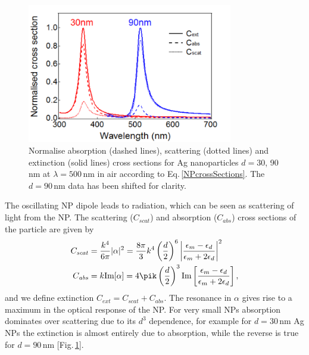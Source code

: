 \begin{figure}[h!] 
\centering    
\includegraphics[width=0.8\textwidth]{Fig8}
\caption{Normalise absorption (dashed lines), scattering (dotted lines) and extinction (solid lines) cross sections for Ag nanoparticles $d=30$, 90\,nm at $\lambda=500$\,nm in air according to Eq.\,\ref{NPcrossSections}. The $d=90$\,nm data has been shifted for clarity.}
\label{3Fig8}
\end{figure}

The oscillating NP dipole leads to radiation, which can be seen as scattering of light from the NP. The scattering ($C_{\mathit{scat}}$) and absorption ($C_{\mathit{abs}}$) cross sections of the particle are given by
\begin{subequations}
\label{NPcrossSections}
\begin{align}
C_{\mathit{scat}} &= \frac{k^4}{6\pi}|\alpha|^2 = \frac{8\pi}{3}k^4\left(\frac{d}{2}\right)^6 \left|\frac{\epsilon_m-\epsilon_d}{\epsilon_m+2\epsilon_d}\right|^2 \label{Scat}\\
C_{\mathit{abs}} &= k\textrm{Im}[\alpha] = 4\pik\left(\frac{d}{2}\right)^3\textrm{Im}\left[\frac{\epsilon_m-\epsilon_d}{\epsilon_m+2\epsilon_d}\right] \label{abs} ,
\end{align}
\end{subequations}
and we define extinction $C_{\mathit{ext}} = C_{\mathit{scat}}+C_{\mathit{abs}}$. The resonance in $\alpha$ gives rise to a maximum in the optical response of the NP. For very small NPs absorption dominates over scattering due to its $d^3$ dependence, for example for $d=30$\,nm Ag NPs the extinction is almost entirely due to absorption, while the reverse is true for $d=90$\,nm [Fig.\,\ref{3Fig8}].

